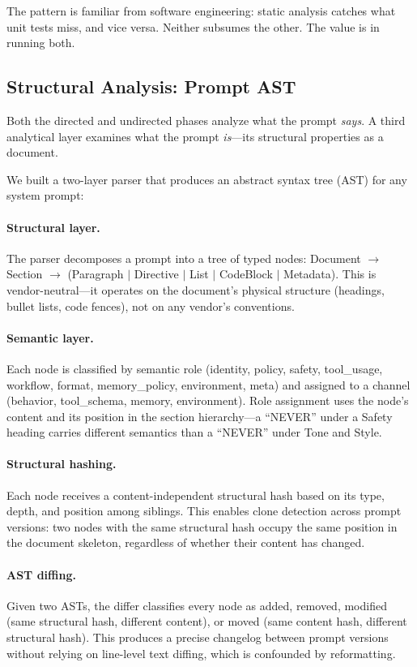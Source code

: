 \documentclass[11pt,a4paper]{article}
\begin{document}
The pattern is familiar from software engineering: static analysis
catches what unit tests miss, and vice versa. Neither subsumes the
other. The value is in running both.


\subsection{Structural Analysis: Prompt AST}
\label{sec:ast}

Both the directed and undirected phases analyze what the prompt
\emph{says}. A third analytical layer examines what the prompt
\emph{is}---its structural properties as a document.

We built a two-layer parser that produces an abstract syntax tree (AST)
for any system prompt:

\paragraph{Structural layer.} The parser decomposes a prompt into a
tree of typed nodes: Document $\to$ Section $\to$ (Paragraph $|$
Directive $|$ List $|$ CodeBlock $|$ Metadata). This is
vendor-neutral---it operates on the document's physical structure
(headings, bullet lists, code fences), not on any vendor's conventions.

\paragraph{Semantic layer.} Each node is classified by semantic role
(identity, policy, safety, tool\_usage, workflow, format,
memory\_policy, environment, meta) and assigned to a channel (behavior,
tool\_schema, memory, environment). Role assignment uses the node's
content and its position in the section hierarchy---a ``NEVER'' under a
Safety heading carries different semantics than a ``NEVER'' under Tone
and Style.

\paragraph{Structural hashing.} Each node receives a
content-independent structural hash based on its type, depth, and
position among siblings. This enables clone detection across prompt
versions: two nodes with the same structural hash occupy the same
position in the document skeleton, regardless of whether their content
has changed.

\paragraph{AST diffing.} Given two ASTs, the differ classifies every
node as added, removed, modified (same structural hash, different
content), or moved (same content hash, different structural hash). This
produces a precise changelog between prompt versions without relying on
line-level text diffing, which is confounded by reformatting.
\end{document}
